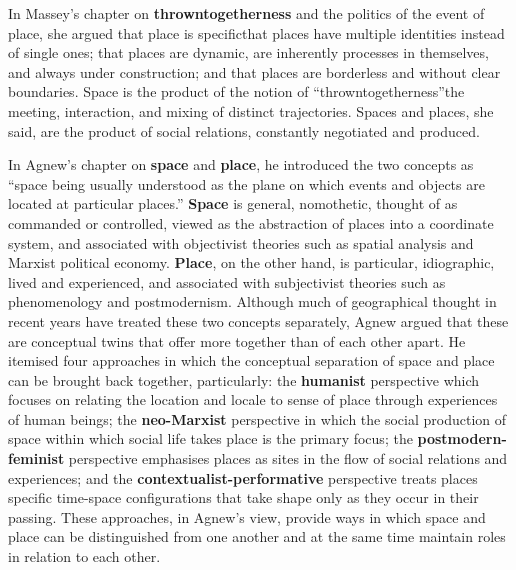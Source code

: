 \documentclass[a4paper, 10.5pt]{article} %
\begin{document}
In Massey's chapter on \textbf{throwntogetherness} and the politics of the event of place, she argued that place is specific\textemdash{}that places have multiple identities instead of single ones; that places are dynamic, are inherently processes in themselves, and always under construction; and that places are borderless and without clear boundaries. Space is the product of the notion of \enquote{throwntogetherness}\textemdash{}the meeting, interaction, and mixing of distinct trajectories. Spaces and places, she said, are the product of social relations, constantly negotiated and produced.

In Agnew's chapter on \textbf{space} and \textbf{place}, he introduced the two concepts as \enquote{space being usually understood as the plane on which events and objects are located at particular places.} \textbf{Space} is general, nomothetic, thought of as commanded or controlled, viewed as the abstraction of places into a coordinate system, and associated with objectivist theories such as spatial analysis and Marxist political economy. \textbf{Place}, on the other hand, is particular, idiographic, lived and experienced, and associated with subjectivist theories such as phenomenology and postmodernism. Although much of geographical thought in recent years have treated these two concepts separately, Agnew argued that these are conceptual twins that offer more together than of each other apart. He itemised four approaches in which the conceptual separation of space and place can be brought back together, particularly: the \textbf{humanist} perspective which focuses on relating the location and locale to sense of place through experiences of human beings; the \textbf{neo-Marxist} perspective in which the social production of space within which social life takes place is the primary focus; the \textbf{postmodern-feminist} perspective emphasises places as sites in the flow of social relations and experiences; and the \textbf{contextualist-performative} perspective treats places specific time-space configurations that take shape only as they occur in their passing. These approaches, in Agnew's view, provide ways in which space and place can be distinguished from one another and at the same time maintain roles in relation to each other.
\end{document}
